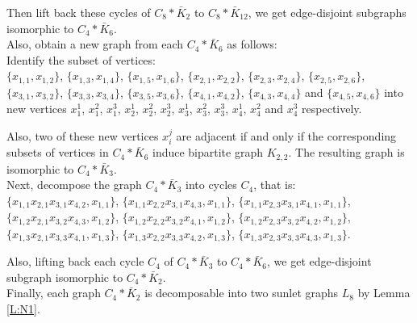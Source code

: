 \documentclass[12pt]{report}
\begin{document}
Then lift back these cycles of $C_8*\bar{K}_2$ to
$C_8*\bar{K}_{12}$, we get edge-disjoint subgraphs isomorphic to
$C_4*\bar{K}_6$.\\
Also, obtain a new graph from each $C_4*\bar{K}_6$ as follows:\\
Identify the subset of vertices:\\
$\{x_{1,1},x_{1,2}\}$, $\{x_{1,3},x_{1,4}\}$, $\{x_{1,5},x_{1,6}\}$,
$\{x_{2,1},x_{2,2}\}$, $\{x_{2,3},x_{2,4}\}$, $\{x_{2,5},x_{2,6}\}$,
$\{x_{3,1},x_{3,2}\}$, $\{x_{3,3},x_{3,4}\}$, $\{x_{3,5},x_{3,6}\}$,
$\{x_{4,1},x_{4,2}\}$, $\{x_{4,3},x_{4,4}\}$ and
$\{x_{4,5},x_{4,6}\}$ into new vertices $x_1^1$, $x_1^2$, $x_1^3$,
$x_2^1$, $x_2^2$, $x_2^3$, $x_3^1$, $x_3^2$, $x_3^3$, $x_4^1$,
$x_4^2$ and $x_4^3$ respectively.

Also, two of these new vertices $x_i^j$ are adjacent if and only if
the corresponding subsets of vertices in $C_4*\bar{K}_6$ induce
bipartite graph $K_{2,2}$. The resulting graph is isomorphic to
$C_4*\bar{K}_3$.\\
Next, decompose the graph $C_4*\bar{K}_3$ into cycles $C_4$, that
is:\\
$\{x_{1,1}x_{2,1}x_{3,1}x_{4,2},x_{1,1}\}$,
$\{x_{1,1}x_{2,2}x_{3,1}x_{4,3},x_{1,1}\}$,
$\{x_{1,1}x_{2,3}x_{3,1}x_{4,1},x_{1,1}\}$,
$\{x_{1,2}x_{2,1}x_{3,2}x_{4,3},x_{1,2}\}$,
$\{x_{1,2}x_{2,2}x_{3,2}x_{4,1},x_{1,2}\}$,
$\{x_{1,2}x_{2,3}x_{3,2}x_{4,2},x_{1,2}\}$,
$\{x_{1,3}x_{2,1}x_{3,3}x_{4,1},x_{1,3}\}$,
$\{x_{1,3}x_{2,2}x_{3,3}x_{4,2},x_{1,3}\}$,
$\{x_{1,3}x_{2,3}x_{3,3}x_{4,3},x_{1,3}\}$.

Also, lifting back each cycle $C_4$ of $C_4*\bar{K}_3$ to
$C_4*\bar{K}_6$, we get edge-disjoint subgraph isomorphic to
$C_4*\bar{K}_2$.\\
Finally, each  graph $C_4*\bar{K}_2$ is decomposable into two sunlet
graphs $L_8$ by Lemma \ref{L:N1}.
\end{document}
